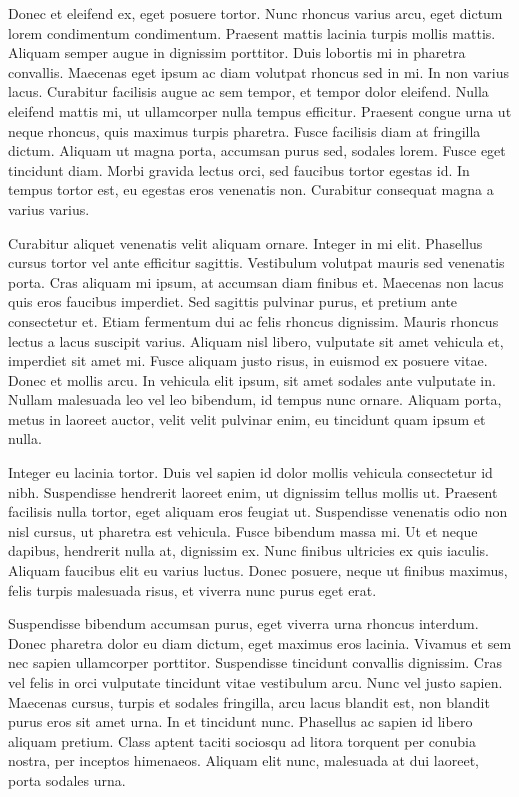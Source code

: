 \documentclass[a4paper,twoside,notitlepage,openright,11pt]{report}
\begin{document}
Donec et eleifend ex, eget posuere tortor. Nunc rhoncus varius arcu, eget dictum lorem condimentum condimentum. Praesent mattis lacinia turpis mollis mattis. Aliquam semper augue in dignissim porttitor. Duis lobortis mi in pharetra convallis. Maecenas eget ipsum ac diam volutpat rhoncus sed in mi. In non varius lacus. Curabitur facilisis augue ac sem tempor, et tempor dolor eleifend. Nulla eleifend mattis mi, ut ullamcorper nulla tempus efficitur. Praesent congue urna ut neque rhoncus, quis maximus turpis pharetra. Fusce facilisis diam at fringilla dictum. Aliquam ut magna porta, accumsan purus sed, sodales lorem. Fusce eget tincidunt diam. Morbi gravida lectus orci, sed faucibus tortor egestas id. In tempus tortor est, eu egestas eros venenatis non. Curabitur consequat magna a varius varius.

Curabitur aliquet venenatis velit aliquam ornare. Integer in mi elit. Phasellus cursus tortor vel ante efficitur sagittis. Vestibulum volutpat mauris sed venenatis porta. Cras aliquam mi ipsum, at accumsan diam finibus et. Maecenas non lacus quis eros faucibus imperdiet. Sed sagittis pulvinar purus, et pretium ante consectetur et. Etiam fermentum dui ac felis rhoncus dignissim. Mauris rhoncus lectus a lacus suscipit varius. Aliquam nisl libero, vulputate sit amet vehicula et, imperdiet sit amet mi. Fusce aliquam justo risus, in euismod ex posuere vitae. Donec et mollis arcu. In vehicula elit ipsum, sit amet sodales ante vulputate in. Nullam malesuada leo vel leo bibendum, id tempus nunc ornare. Aliquam porta, metus in laoreet auctor, velit velit pulvinar enim, eu tincidunt quam ipsum et nulla.

Integer eu lacinia tortor. Duis vel sapien id dolor mollis vehicula consectetur id nibh. Suspendisse hendrerit laoreet enim, ut dignissim tellus mollis ut. Praesent facilisis nulla tortor, eget aliquam eros feugiat ut. Suspendisse venenatis odio non nisl cursus, ut pharetra est vehicula. Fusce bibendum massa mi. Ut et neque dapibus, hendrerit nulla at, dignissim ex. Nunc finibus ultricies ex quis iaculis. Aliquam faucibus elit eu varius luctus. Donec posuere, neque ut finibus maximus, felis turpis malesuada risus, et viverra nunc purus eget erat.

Suspendisse bibendum accumsan purus, eget viverra urna rhoncus interdum. Donec pharetra dolor eu diam dictum, eget maximus eros lacinia. Vivamus et sem nec sapien ullamcorper porttitor. Suspendisse tincidunt convallis dignissim. Cras vel felis in orci vulputate tincidunt vitae vestibulum arcu. Nunc vel justo sapien. Maecenas cursus, turpis et sodales fringilla, arcu lacus blandit est, non blandit purus eros sit amet urna. In et tincidunt nunc. Phasellus ac sapien id libero aliquam pretium. Class aptent taciti sociosqu ad litora torquent per conubia nostra, per inceptos himenaeos. Aliquam elit nunc, malesuada at dui laoreet, porta sodales urna.
\end{document}
